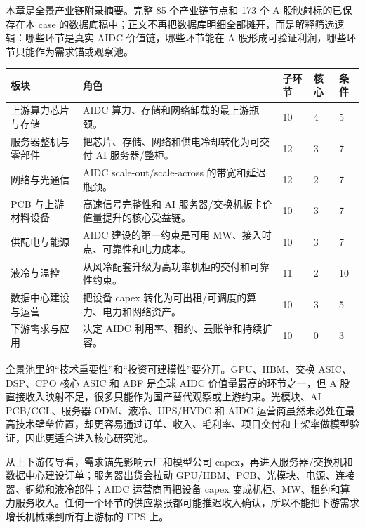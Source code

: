 本章是全景产业链附录摘要。完整 85 个产业链节点和 173 个 A 股映射标的已保存在本 case 的数据底稿中；正文不再把数据库明细全部摊开，而是解释筛选逻辑：哪些环节是真实 AIDC 价值链，哪些环节能在 A 股形成可验证利润，哪些环节只能作为需求锚或观察池。

\begin{exhibitbox}[全景产业链覆盖摘要]
\scriptsize
\begin{tabularx}{\textwidth}{L{3.0cm}X R{1.3cm}R{1.3cm}R{1.4cm}}
\toprule
\textbf{板块} & \textbf{角色} & \textbf{子环节} & \textbf{核心} & \textbf{条件}\\
\midrule
上游算力芯片与存储 & AIDC 算力、存储和网络卸载的最上游瓶颈。 & 10 & 4 & 5\\
服务器整机与零部件 & 把芯片、存储、网络和供电冷却转化为可交付 AI 服务器/整柜。 & 12 & 3 & 7\\
网络与光通信 & AIDC scale-out/scale-across 的带宽和延迟瓶颈。 & 12 & 2 & 7\\
PCB 与上游材料设备 & 高速信号完整性和 AI 服务器/交换机板卡价值量提升的核心受益链。 & 10 & 3 & 7\\
供配电与能源 & AIDC 建设的第一约束是可用 MW、接入时点、可靠性和电力成本。 & 10 & 3 & 7\\
液冷与温控 & 从风冷配套升级为高功率机柜的交付和可靠性约束。 & 11 & 2 & 10\\
数据中心建设与运营 & 把设备 capex 转化为可出租/可调度的算力、电力和网络资产。 & 10 & 3 & 5\\
下游需求与应用 & 决定 AIDC 利用率、租约、云账单和持续扩容。 & 10 & 0 & 3\\
\bottomrule
\end{tabularx}
\end{exhibitbox}

全景池里的“技术重要性”和“投资可建模性”要分开。GPU、HBM、交换 ASIC、DSP、CPO 核心 ASIC 和 ABF 是全球 AIDC 价值量最高的环节之一，但 A 股直接收入映射不足，很多只能作为国产替代观察或上游约束。光模块、AI PCB/CCL、服务器 ODM、液冷、UPS/HVDC 和 AIDC 运营商虽然未必处在最高技术壁垒位置，却更容易通过订单、收入、毛利率、项目交付和上架率做模型验证，因此更适合进入核心研究池。

从上下游传导看，需求锚先影响云厂和模型公司 capex，再进入服务器/交换机和数据中心建设订单；服务器出货会拉动 GPU/HBM、PCB、光模块、电源、连接器、铜缆和液冷部件；AIDC 运营商再把设备 capex 变成机柜、MW、租约和算力服务收入。任何一个环节的供应紧张都可能推迟收入确认，所以不能把下游需求增长机械乘到所有上游标的 EPS 上。

